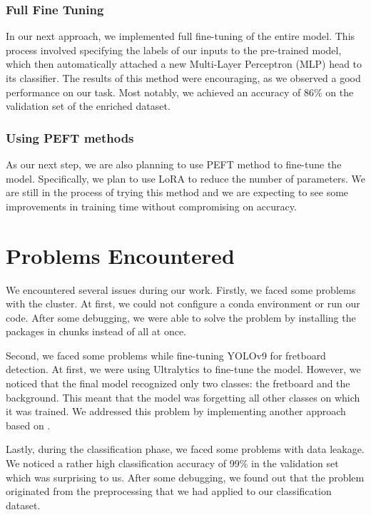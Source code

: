 \documentclass[10pt,twocolumn,letterpaper]{article}
\begin{document}
\subsubsection{Full Fine Tuning}
In our next approach, we implemented full fine-tuning of the entire model. This process involved specifying the labels of our inputs to the pre-trained model, which then automatically attached a new Multi-Layer Perceptron (MLP) head to its classifier. The results of this method were encouraging, as we observed a good performance on our task. Most notably, we achieved an accuracy of 86\% on the validation set of the enriched dataset.

\subsubsection{Using PEFT methods}
As our next step, we are also planning to use PEFT \cite{peft} method to fine-tune the model. Specifically, we plan to use LoRA to reduce the number of parameters. We are still in the process of trying this method and we are expecting to see some improvements in training time without compromising on accuracy.

\section{Problems Encountered}
We encountered several issues during our work. Firstly, we faced some problems with the cluster. At first, we could not configure a conda environment or run our code. After some debugging, we were able to solve the problem by installing the packages in chunks instead of all at once.

Second, we faced some problems while fine-tuning YOLOv9 for fretboard detection. At first, we were using Ultralytics to fine-tune the model. However, we noticed that the final model recognized only two classes: the fretboard and the background. This meant that the model was forgetting all other classes on which it was trained. We addressed this problem by implementing another approach based on \cite{Extendin94:online}.

Lastly, during the classification phase, we faced some problems with data leakage. We noticed a rather high classification accuracy of 99\% in the validation set which was surprising to us. After some debugging, we found out that the problem originated from the preprocessing that we had applied to our classification dataset.


{\small


}
\end{document}
